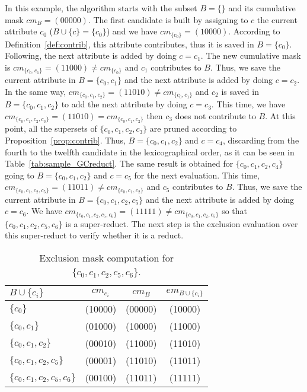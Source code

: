\documentclass[letterpaper, twoside, openright, 12pt]{book}%
\begin{document}
	In this example, the algorithm starts with the subset $B=\lbrace \rbrace$ and its cumulative mask $cm_B=(00000)$. The first candidate is built by assigning to $c$ the current attribute  $c_0$ ($B\cup \lbrace c\rbrace = \lbrace c_0\rbrace$) and we have $cm_{\lbrace c_0\rbrace}=(10000)$. According to Definition~\ref{def:contrib}, this attribute contributes, thus it is saved in $B=\lbrace c_0\rbrace$. Following, the next attribute is added  by doing $c = c_1$. The new cumulative mask is $cm_{\lbrace c_0,c_1\rbrace}=(11000)\neq cm_{\lbrace c_0\rbrace}$ and $c_1$ contributes to $B$. Thus, we save the current attribute in $B = \lbrace c_0,c_1\rbrace$ and the next attribute is added by doing $c = c_2$. In the same way, $cm_{\lbrace c_0,c_1,c_2\rbrace}=(11010)\neq cm_{\lbrace c_0,c_1\rbrace}$ and $c_2$ is saved in $B = \lbrace c_0,c_1,c_2\rbrace$ to add the next attribute by doing $c = c_3$. This time, we have $cm_{\lbrace c_0,c_1,c_2,c_3\rbrace}=(11010) = cm_{\lbrace c_0,c_1,c_2\rbrace}$ then $c_3$ does not contribute to $B$. At this point, all the supersets of $\lbrace c_0,c_1,c_2,c_3\rbrace$ are pruned according to Proposition~\ref{prop:contrib}. Thus, $B = \lbrace c_0,c_1,c_2\rbrace$ and $c = c_4$, discarding from the fourth to the twelfth candidate in the lexicographical order, as it can be seen in  Table~\ref{tab:sample_GCreduct}. The same result is obtained for $\lbrace c_0,c_1,c_2,c_4\rbrace$ going to $B = \lbrace c_0,c_1,c_2\rbrace$ and $c = c_5$ for the next evaluation. This time, $cm_{\lbrace c_0,c_1,c_2,c_5\rbrace}=(11011)\neq cm_{\lbrace c_0,c_1,c_2\rbrace}$ and $c_5$ contributes to $B$. Thus, we save the current attribute in $B = \lbrace c_0,c_1,c_2,c_5\rbrace$ and the next attribute is added by doing $c = c_6$. We have $cm_{\lbrace c_0,c_1,c_2,c_5,c_6\rbrace}=(11111)\neq cm_{\lbrace c_0,c_1,c_2,c_5\rbrace}$ so that $\lbrace c_0,c_1,c_2,c_5,c_6\rbrace$ is a super-reduct. The next step is the exclusion evaluation over this super-reduct to verify whether it is a reduct.
 
  	\begin{table}[H]
  		\caption{Exclusion mask computation for $\lbrace c_0,c_1,c_2,c_5,c_6\rbrace$.}\label{tab:em}
  		\centering 
  		\begin{tabular}{lccc}
  			\hline
  			$B\cup \lbrace c_i\rbrace$           & $cm_{c_i}$ & $cm_B$  & $em_{B\cup \lbrace c_i\rbrace}$ \\
  			\hline
  			$\lbrace c_0\rbrace$                 & (10000)    & (00000) & (10000)          \\
  			$\lbrace c_0,c_1\rbrace$             & (01000)    & (10000) & (11000)          \\
  			$\lbrace c_0,c_1,c_2\rbrace$         & (00010)    & (11000) & (11010)          \\
  			$\lbrace c_0,c_1,c_2,c_5\rbrace$     & (00001)    & (11010) & (11011)          \\
  			$\lbrace c_0,c_1,c_2,c_5,c_6\rbrace$ & (00100)    & (11011) & (11111)          \\
  			\hline
  		\end{tabular}
  	\end{table}
	  	
\end{document}
